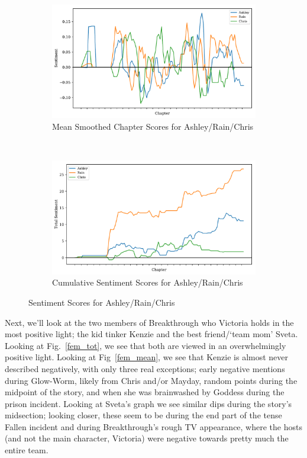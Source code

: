\documentclass[11pt]{article}
\begin{document}
\begin{figure}[H]
\centering
\begin{subfigure}[t]{0.45\textwidth}
\centering
\includegraphics[width=\textwidth]{ARC Graphs v2/mean_smoothed_sent_scores.pdf}
\caption{Mean Smoothed Chapter Scores for Ashley/Rain/Chris}
\label{arc_mean}
\end{subfigure}
~
\begin{subfigure}[t]{0.45\textwidth}
\centering
\includegraphics[width=\textwidth]{ARC Graphs v2/total_sent_scores.pdf}
\caption{Cumulative Sentiment Scores for Ashley/Rain/Chris}
\label{arc_total}
\end{subfigure}
\label{arc_graphs}
\caption{Sentiment Scores for Ashley/Rain/Chris}
\end{figure}

\noindent
Next, we'll look at the two members of Breakthrough who Victoria holds in the most positive light; the kid tinker Kenzie and the best friend/`team mom' Sveta. Looking at Fig.~\ref{fem_tot}, we see that both are viewed in an overwhelmingly positive light. Looking at Fig~\ref{fem_mean}, we see that Kenzie is almost never described negatively, with only three real exceptions; early negative mentions during Glow-Worm, likely from Chris and/or Mayday, random points during the midpoint of the story, and when she was brainwashed by Goddess during the prison incident. Looking at Sveta's graph we see similar dips during the story's midsection; looking closer, these seem to be during the end part of the tense Fallen incident and during Breakthrough's rough TV appearance, where the hosts (and not the main character, Victoria) were negative towards pretty much the entire team.
\end{document}
